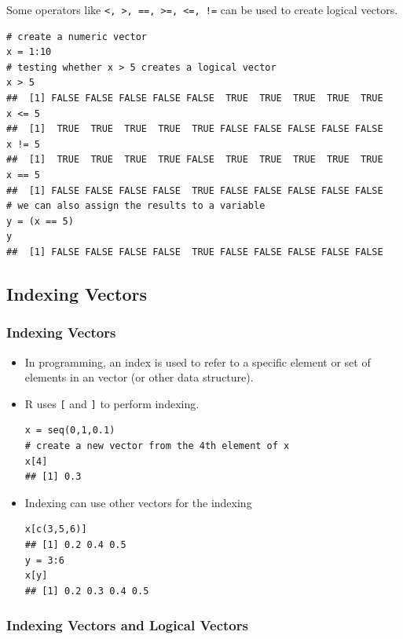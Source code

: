 \documentclass[]{article}
\theoremstyle{definition}
\theoremstyle{definition}
\theoremstyle{remark}
\begin{document}
Some operators like
\texttt{\textless{},\ \textgreater{},\ ==,\ \textgreater{}=,\ \textless{}=,\ !=}
can be used to create logical vectors.

\begin{verbatim}
# create a numeric vector
x = 1:10
# testing whether x > 5 creates a logical vector
x > 5
##  [1] FALSE FALSE FALSE FALSE FALSE  TRUE  TRUE  TRUE  TRUE  TRUE
x <= 5
##  [1]  TRUE  TRUE  TRUE  TRUE  TRUE FALSE FALSE FALSE FALSE FALSE
x != 5
##  [1]  TRUE  TRUE  TRUE  TRUE FALSE  TRUE  TRUE  TRUE  TRUE  TRUE
x == 5
##  [1] FALSE FALSE FALSE FALSE  TRUE FALSE FALSE FALSE FALSE FALSE
# we can also assign the results to a variable
y = (x == 5)
y
##  [1] FALSE FALSE FALSE FALSE  TRUE FALSE FALSE FALSE FALSE FALSE
\end{verbatim}

\subsection{Indexing Vectors}\label{indexing-vectors}

\subsubsection{Indexing Vectors}\label{indexing-vectors-1}

\begin{itemize}
\item
  {In programming, an index is used to refer to a specific element or
  set of elements in an vector (or other data structure).}
\item
  {R uses \texttt{{[}} and \texttt{{]}} to perform indexing.}

\begin{verbatim}
x = seq(0,1,0.1)
# create a new vector from the 4th element of x
x[4]
## [1] 0.3
\end{verbatim}
\item
  {Indexing can use other vectors for the indexing}

\begin{verbatim}
x[c(3,5,6)]
## [1] 0.2 0.4 0.5
y = 3:6
x[y]
## [1] 0.2 0.3 0.4 0.5
\end{verbatim}
\end{itemize}

\subsubsection{Indexing Vectors and Logical
Vectors}\label{indexing-vectors-and-logical-vectors}
\end{document}
